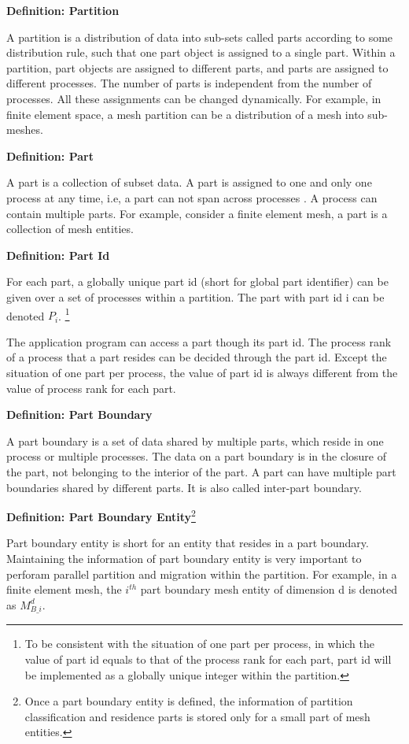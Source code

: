 \textbf{Definition: Partition}

A partition is a distribution of data into sub-sets called parts
according to some distribution rule, such that one part object is
assigned to a single part. Within a partition, part objects are
assigned to
different parts, and parts are assigned to different processes. The
number of parts is independent from the number of processes. All these
assignments can be changed dynamically. For example, in finite element
space, a mesh partition can be a distribution of a mesh into
sub-meshes.  


\textbf{Definition: Part} 

A part is a collection of subset data. A part is assigned to one and
only one process at any time, i.e, a part can not span across
processes \cite{ITAPS}. A process can contain multiple parts. For example,
consider a finite element mesh, a part is a collection of mesh
entities.  

\textbf{Definition: Part Id}  

For each part, a globally unique part id (short for global part
identifier) can be given over a set of processes within a 
partition. The part with part id i can be denoted $P_i$. \footnote{To
  be 
  consistent with the situation of one part per process, in which the
  value of part id equals to that of the process rank for each part,
  part id will be implemented as a globally unique integer within the
  partition.}  

The application program can access a part though its part id. The
process rank of a process that a part resides can be decided through
the part id. Except the situation of one part per process, the value
of part id is always different from the value of process rank for each
part.  

\textbf{Definition: Part Boundary} 

 A part boundary is a set of data shared by multiple parts, which
 reside in one process or multiple processes. The data on a part
 boundary is in the closure of the part, not belonging to the interior
 of the part. A part can have multiple part boundaries shared by
 different parts. It is also called inter-part boundary. 


\textbf{Definition: Part Boundary Entity}\footnote{Once a part
  boundary
  entity is defined, the information of partition classification and
  residence parts is stored only for a small part of mesh entities.}

Part boundary entity is short for an entity that resides in a part
boundary. Maintaining the information of part boundary entity is very
important to perforam parallel partition and migration within the
partition. For example, in a finite element mesh, the $i^{th}$ part
boundary mesh entity of dimension d is denoted as $M^d_{B\_i}$.


